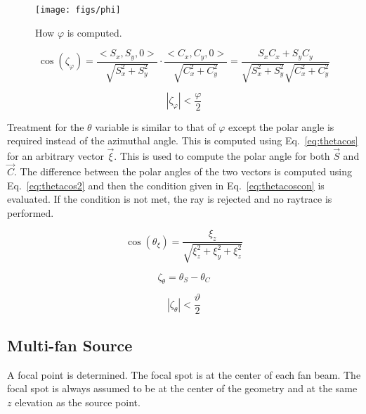 \begin{figure}[tb]
  \begin{center}
   \texttt{[image: figs/phi]}
  \end{center}
  \caption{How $\varphi$ is computed.}
\label{fig:phi}
\end{figure}

\begin{equation}\label{eq:phicos}
\cos(\zeta_\varphi) = \frac{<S_x, S_y, 0>}{\sqrt{S_x^2 + S_y^2}} \cdot \frac{<C_x, C_y, 0>}{\sqrt{C_x^2 + C_y^2}} = \frac{S_x C_x + S_y C_y}{\sqrt{S_x^2 + S_y^2} \sqrt{C_x^2 + C_y^2}}
\end{equation}

\begin{equation}\label{eq:phicoscon}
|\zeta_\varphi| < \frac{\varphi}{2}
\end{equation}

Treatment for the $\theta$ variable is similar to that of $\varphi$ except the polar angle is required instead of the azimuthal angle. This is computed using Eq.~\ref{eq:thetacos} for an arbitrary vector $\vec{\xi}$. This is used to compute the polar angle for both $\vec{S}$ and $\vec{C}$. The difference between the polar angles of the two vectors is computed using Eq.~\ref{eq:thetacos2} and then the condition given in Eq.~\ref{eq:thetacoscon} is evaluated. If the condition is not met, the ray is rejected and no raytrace is performed.

\begin{equation}\label{eq:thetacos}
\cos(\theta_\xi) = \frac{\xi_z}{\sqrt{\xi_z^2 + \xi_y^2 + \xi_z^2}}
\end{equation}

\begin{equation}\label{eq:thetacos2}
\zeta_\theta = \theta_S - \theta_C
\end{equation}

\begin{equation}\label{eq:thetacoscon}
|\zeta_\theta| < \frac{\vartheta}{2}
\end{equation}


\subsection{Multi-fan Source}
A focal point is determined. The focal spot is at the center of each fan beam. The focal spot is always assumed to be at the center of the geometry and at the same $z$ elevation as the source point.

